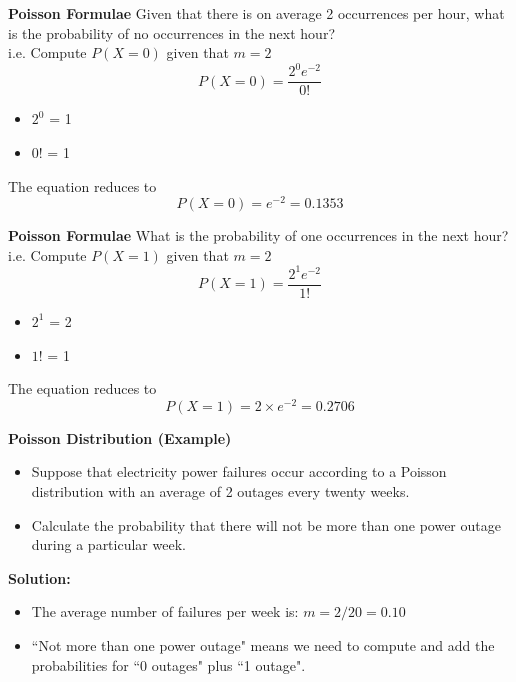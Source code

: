 \documentclass[a4paper,12pt]{article}
\begin{document}
{
\textbf{Poisson Formulae}
Given that there is on average 2 occurrences per hour, what is the probability of no occurrences in the next hour? \\ i.e. Compute $P(X=0)$ given that $m=2$
\Large
\[ P(X = 0)=\frac{2^0 e^{-2}}{0!} \]
\normalsize
\begin{itemize}
\item $2^0$ = 1
\item $0!$ = 1
\end{itemize}
The equation reduces to
\[ P(X = 0)=e^{-2} = 0.1353\]
}
{
\textbf{Poisson Formulae}
What is the probability of one occurrences in the next hour? \\ i.e. Compute $P(X=1)$ given that $m=2$
\Large
\[ P(X = 1)=\frac{2^1 e^{-2}}{1!} \]
\normalsize
\begin{itemize}
\item $2^1$ = 2
\item $1!$ = 1
\end{itemize}
The equation reduces to
\[ P(X = 1) = 2 \times e^{-2} = 0.2706\]
}
{
\textbf{Poisson Distribution (Example)}
\begin{itemize}

\item Suppose that electricity power failures occur according to a Poisson distribution
with an average of 2 outages every twenty weeks. \item Calculate the probability that there will
not be more than one power outage during a particular week.
\end{itemize}

\textbf{Solution:}

\begin{itemize}
\item The average number of failures per week is: $m = 2/20 = 0.10$

\item ``Not more than one  power outage" means we need to compute and add the probabilities for ``0 outages" plus ``1 outage".
\end{itemize}

}
\end{document}

